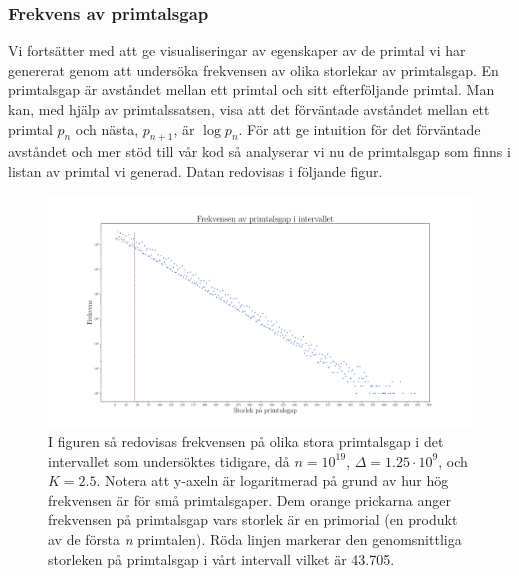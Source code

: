 \subsubsection{Frekvens av primtalsgap}

Vi fortsätter med att ge visualiseringar av egenskaper av de primtal vi har genererat genom att undersöka frekvensen av olika storlekar av primtalsgap. 
En primtalsgap är avståndet mellan ett primtal och sitt efterföljande primtal.
Man kan, med hjälp av primtalssatsen, visa att det förväntade avståndet mellan ett primtal \(p_n\) och nästa, \(p_{n+1}\), är \(\log p_n\).
För att ge intuition för det förväntade avståndet och mer stöd till vår kod så analyserar vi nu de primtalsgap som finns i listan av primtal vi generad. Datan redovisas i följande figur.

\begin{figure}[H]
    \centering
    \includegraphics[width = \textwidth]{coen/Images/GapsNoKapps.pdf}
    \caption{I figuren så redovisas frekvensen på olika stora primtalsgap i det intervallet som undersöktes tidigare, då \(n = 10^{19}\), \(\Delta = 1.25\cdot10^{9}\), och \(K = 2.5\). Notera att y-axeln är logaritmerad på grund av hur hög frekvensen är för små primtalsgaper. 
    Dem orange prickarna anger frekvensen på primtalsgap vars storlek är en primorial (en produkt av de första \textit{n} primtalen).
    Röda linjen markerar den genomsnittliga storleken på primtalsgap i vårt intervall vilket är 43.705.}
    \label{fig:res.gap}
\end{figure}

